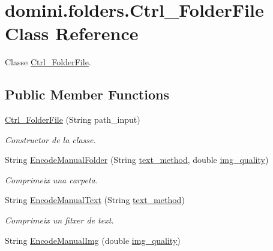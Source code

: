 \hypertarget{classdomini_1_1folders_1_1Ctrl__FolderFile}{}\section{domini.\+folders.\+Ctrl\+\_\+\+Folder\+File Class Reference}
\label{classdomini_1_1folders_1_1Ctrl__FolderFile}


Classe \hyperlink{classdomini_1_1folders_1_1Ctrl__FolderFile}{Ctrl\+\_\+\+Folder\+File}.  


\subsection*{Public Member Functions}
\begin{DoxyCompactItemize}
\item 
\hyperlink{classdomini_1_1folders_1_1Ctrl__FolderFile_aabe2038931ca63100a2fc4b12936142d}{Ctrl\+\_\+\+Folder\+File} (String path\+\_\+input)
\begin{DoxyCompactList}\small\item\em Constructor de la classe. \end{DoxyCompactList}\item 
String \hyperlink{classdomini_1_1folders_1_1Ctrl__FolderFile_a8cb5f1a979d5882dd244d69806d5b237}{Encode\+Manual\+Folder} (String \hyperlink{classdomini_1_1folders_1_1Ctrl__FolderFile_a75ef571be454360b835f552d2cf20741}{text\+\_\+method}, double \hyperlink{classdomini_1_1folders_1_1Ctrl__FolderFile_a7990a74c394d53a58ebbf4a7872c700d}{img\+\_\+quality})
\begin{DoxyCompactList}\small\item\em Comprimeix una carpeta. \end{DoxyCompactList}\item 
String \hyperlink{classdomini_1_1folders_1_1Ctrl__FolderFile_a77b9d8244dd36e77516a9dc43ec50ed8}{Encode\+Manual\+Text} (String \hyperlink{classdomini_1_1folders_1_1Ctrl__FolderFile_a75ef571be454360b835f552d2cf20741}{text\+\_\+method})
\begin{DoxyCompactList}\small\item\em Comprimeix un fitxer de text. \end{DoxyCompactList}\item 
String \hyperlink{classdomini_1_1folders_1_1Ctrl__FolderFile_aa12af32101598eebcaaad4d0dbe69902}{Encode\+Manual\+Img} (double \hyperlink{classdomini_1_1folders_1_1Ctrl__FolderFile_a7990a74c394d53a58ebbf4a7872c700d}{img\+\_\+quality})

\end{DoxyCompactItemize}
